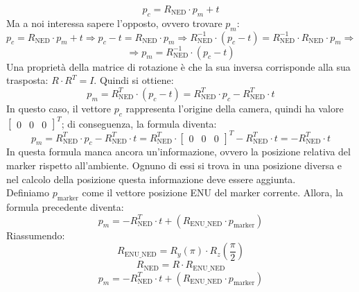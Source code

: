 \[
p_c = R_\mathrm{NED}\cdot p_m+t
\]
Ma a noi interessa sapere l'opposto, ovvero trovare $p_m$:
\[
p_c = R_\mathrm{NED}\cdot p_m+t \Rightarrow p_c-t = R_\mathrm{NED}\cdot p_m \Rightarrow R_\mathrm{NED}^{-1}\cdot (p_c-t) = R_\mathrm{NED}^{-1}\cdot R_\mathrm{NED}\cdot p_m \Rightarrow
\]
\[
\Rightarrow p_m = R_\mathrm{NED}^{-1}\cdot (p_c-t)
\]
Una proprietà della matrice di rotazione è che la sua inversa corrisponde alla sua trasposta: $R\cdot R^T=I$. Quindi si ottiene:
\[
p_m = R_\mathrm{NED}^T\cdot (p_c-t) = R_\mathrm{NED}^T\cdot p_c-R_\mathrm{NED}^T\cdot t
\]
In questo caso, il vettore $p_c$ rappresenta l'origine della camera, quindi ha valore $\begin{bmatrix} 0 & 0 & 0 \end{bmatrix}^T$; di conseguenza, la formula diventa:
\[
p_m = R_\mathrm{NED}^T\cdot p_c-R_\mathrm{NED}^T\cdot t = R_\mathrm{NED}^T\cdot \begin{bmatrix} 0 & 0 & 0 \end{bmatrix}^T-R_\mathrm{NED}^T\cdot t = -R_\mathrm{NED}^T\cdot t
\]
In questa formula manca ancora un'informazione, ovvero la posizione relativa del marker rispetto all'ambiente. Ognuno di essi si trova in una posizione diversa e nel calcolo della posizione questa informazione deve essere aggiunta. \\
Definiamo $p_\mathrm{marker}$ come il vettore posizione ENU del marker corrente. Allora, la formula precedente diventa:
\[
p_m = -R_\mathrm{NED}^T\cdot t + (R_\mathrm{ENU\_NED}\cdot p_\mathrm{marker})
\]
Riassumendo:
\[
R_\mathrm{ENU\_NED}=R_y(\pi)\cdot R_z(\frac{\pi}{2})
\]
\[
R_\mathrm{NED} = R\cdot R_\mathrm{ENU\_NED}
\]
\[
\boxed{
		p_m = -R_\mathrm{NED}^T\cdot t + (R_\mathrm{ENU\_NED}\cdot p_\mathrm{marker})
}
\]
